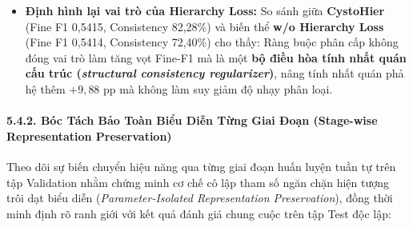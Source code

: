 \documentclass[
  11pt,
  a4paper,
]{article}
\providecommand{\tightlist}{%
  \setlength{\itemsep}{0pt}\setlength{\parskip}{0pt}}
\begin{document}
\begin{itemize}
\tightlist
\item
  \textbf{Định hình lại vai trò của Hierarchy Loss:} So sánh giữa
  \textbf{CystoHier} (Fine F1 0,5415, Consistency 82,28\%) và biến thể
  \textbf{w/o Hierarchy Loss} (Fine F1 0,5414, Consistency 72,40\%) cho
  thấy: Ràng buộc phân cấp không đóng vai trò làm tăng vọt Fine-F1 mà là
  một \textbf{bộ điều hòa tính nhất quán cấu trúc (\emph{structural
  consistency regularizer})}, nâng tính nhất quán phả hệ thêm
  \(+9{,}88\) pp mà không làm suy giảm độ nhạy phân loại.
\end{itemize}

\paragraph{5.4.2. Bóc Tách Bảo Toàn Biểu Diễn Từng Giai Đoạn (Stage-wise
Representation
Preservation)}\label{buxf3c-tuxe1ch-bux1ea3o-touxe0n-biux1ec3u-diux1ec5n-tux1eebng-giai-ux111oux1ea1n-stage-wise-representation-preservation}

Theo dõi sự biến chuyển hiệu năng qua từng giai đoạn huấn luyện tuần tự
trên tập Validation nhằm chứng minh cơ chế cô lập tham số ngăn chặn hiện
tượng trôi dạt biểu diễn (\emph{Parameter-Isolated Representation
Preservation}), đồng thời minh định rõ ranh giới với kết quả đánh giá
chung cuộc trên tập Test độc lập:

\begin{table}[H]
\centering
\caption{Bảng 5.4b: Tiến trình hiệu năng và cô lập tham số qua 3 giai
đoạn huấn luyện trên tập Validation và kết quả chung cuộc trên tập
Test}
\label{tab:sec_table7}
\vspace{3pt}
\end{table}
\end{document}

